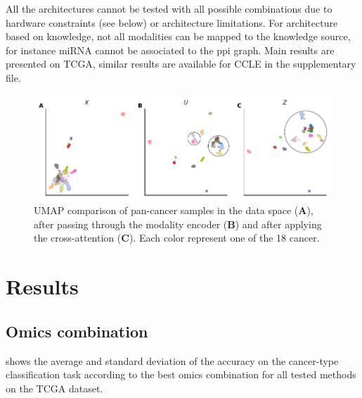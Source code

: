 \documentclass[../main.tex]{subfiles}
\begin{document}
     All the architectures cannot be tested with all possible combinations due to hardware constraints (see below) or architecture limitations.
     For architecture based on knowledge, not all modalities can be mapped to the knowledge source, for instance miRNA cannot be associated to the \gls{ppi} graph.
     Main results are presented on TCGA, similar results are available for CCLE in the supplementary file.

     \begin{figure}
         \centering
         \includegraphics{umap_mRNA.pdf}
         \caption{UMAP comparison of pan-cancer samples in the data space (\textbf{A}), after passing through the modality encoder (\textbf{B}) and after applying the cross-attention (\textbf{C}). Each color represent one of the 18 cancer. }
         \label{fig:umap_mrna}
     \end{figure}

\section{Results}

 \subsection{Omics combination}
      shows the average and standard deviation of the accuracy on the cancer-type classification task according to the best omics combination for all tested methods on the TCGA dataset.
\end{document}

